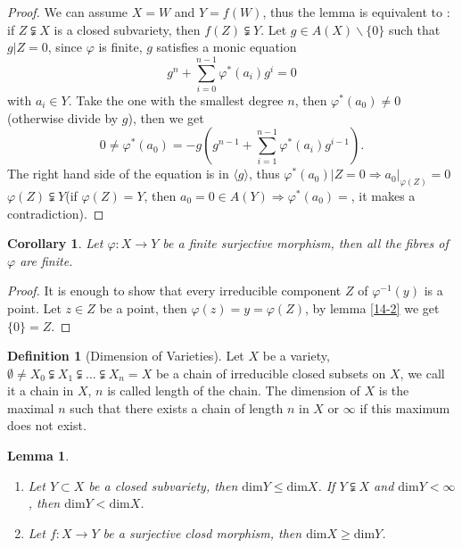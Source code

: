 \documentclass{amsart}
\theoremstyle{plain}
\newtheorem{corollary}{Corollary}
\newtheorem{lemma}{Lemma}
\theoremstyle{definition}
\newtheorem{definition}{Definition}
\theoremstyle{remark}
\numberwithin{equation}{section}
\begin{document}
\begin{proof}
	We can assume $ X=W $ and $ Y=f(W) $, thus the lemma is equivalent to : if $ Z\subsetneqq X $ is a closed subvariety, then $ f(Z)\subsetneqq Y $. Let $ g\in A(X)\backslash\lbrace 0 \rbrace $ such that $ g|Z=0 $, since $ \varphi $ is finite, $ g $ satisfies a monic equation 
	$$
	g^n+\sum\limits_{i=0}^{n-1}\varphi^\ast (a_i)g^i=0
	$$
	with $ a_{i}\in Y $. Take the one with the smallest degree $ n $, then $ \varphi^\ast (a_0)\neq 0 $(otherwise divide by $ g $), then we get 
	$$
	0\neq \varphi^\ast(a_0)=-g(g^{n-1}+\sum\limits_{i=1}^{n-1}\varphi^\ast(a_i)g^{i-1}).
	$$
	The right hand side of the equation is in $ \langle g \rangle $, thus $ \varphi^\ast (a_0)|Z=0 \Rightarrow a_0|_{\varphi(Z)}=0$ $ \varphi(Z)\subsetneqq Y $(if $ \varphi(Z)=Y $, then $ a_0=0\in A(Y)\Rightarrow \varphi^\ast(a_0)= $, it makes a contradiction).
\end{proof}
\begin{corollary}
	Let $ \varphi:X\to Y $ be a finite surjective morphism, then all the fibres of $ \varphi $ are finite.
\end{corollary}
\begin{proof}
	It is enough to show that every irreducible component $ Z $ of $ \varphi^{-1}(y) $ is a point. Let $ z\in Z $ be a point, then $ \varphi(z)=y=\varphi(Z) $, by lemma \ref{14-2} we get $ \lbrace 0 \rbrace= Z $.
\end{proof}
\begin{definition}[Dimension of Varieties]
	Let $ X $ be a variety, $ \emptyset\neq X_0\subsetneqq X_1\subsetneqq\dots\subsetneqq X_n=X $ be a chain of irreducible closed subsets on $ X $, we call it a chain in $ X $, $ n $ is called length of the chain. The dimension of $ X $ is the maximal $ n $ such that there exists a chain of length $ n $ in $ X $ or $ \infty $ if this maximum does not exist.
\end{definition}
\begin{lemma}
	\begin{enumerate}
		\item Let $ Y\subset X $ be a closed subvariety, then $ \text{dim}Y\leq \text{dim}X $. If $ Y\subsetneqq X $ and $ \text{dim}Y <\infty$, then $ \text{dim} Y<\text{dim}X $.
		\item Let $ f:X\to Y $ be a surjective closd morphism, then $ \text{dim}X\geq \text{dim}Y $.
	\end{enumerate}
\end{lemma}
\end{document}
